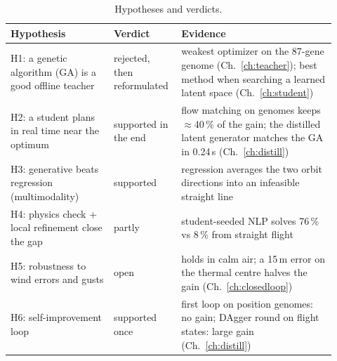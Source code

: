 \documentclass[11pt,a4paper,oneside]{report}
\begin{document}
\begin{table}[ht]\centering\small
\caption{Hypotheses and verdicts.}\label{tab:hypotheses}
\begin{tabular}{@{}p{0.3\linewidth}p{0.17\linewidth}p{0.45\linewidth}@{}}
\toprule
Hypothesis & Verdict & Evidence \\ \midrule
H1: a genetic algorithm (GA) is a good offline teacher & rejected, then reformulated & weakest optimizer on the 87-gene genome (Ch.~\ref{ch:teacher}); best method when searching a learned latent space (Ch.~\ref{ch:student}) \\
H2: a student plans in real time near the optimum & supported in the end & flow matching on genomes keeps $\approx$40\,\% of the gain; the distilled latent generator matches the GA in 0.24\,s (Ch.~\ref{ch:distill}) \\
H3: generative beats regression (multimodality) & supported & regression averages the two orbit directions into an infeasible straight line \\
H4: physics check + local refinement close the gap & partly & student-seeded NLP solves 76\,\% vs 8\,\% from straight flight \\
H5: robustness to wind errors and gusts & open & holds in calm air; a 15\,m error on the thermal centre halves the gain (Ch.~\ref{ch:closedloop}) \\
H6: self-improvement loop & supported once & first loop on position genomes: no gain; DAgger round on flight states: large gain (Ch.~\ref{ch:distill}) \\
\bottomrule
\end{tabular}
\end{table}
\end{document}
